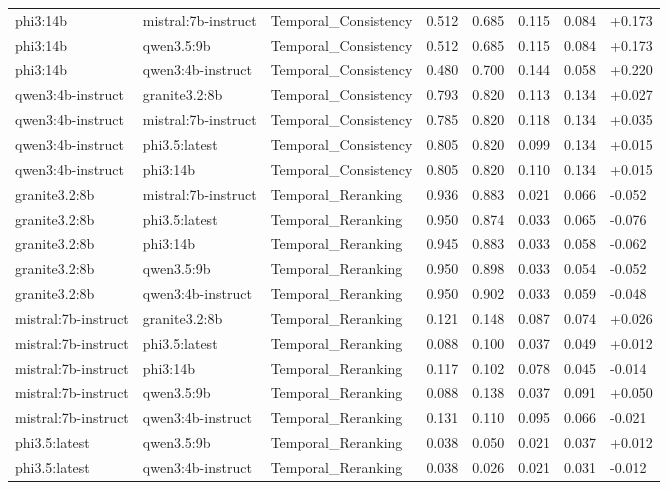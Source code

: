 \begin{table}
\begin{tabular}{llllllll}
phi3:14b & mistral:7b-instruct & Temporal_Consistency & 0.512 & 0.685 & 0.115 & 0.084 & +0.173 \\
phi3:14b & qwen3.5:9b & Temporal_Consistency & 0.512 & 0.685 & 0.115 & 0.084 & +0.173 \\
phi3:14b & qwen3:4b-instruct & Temporal_Consistency & 0.480 & 0.700 & 0.144 & 0.058 & +0.220 \\
qwen3:4b-instruct & granite3.2:8b & Temporal_Consistency & 0.793 & 0.820 & 0.113 & 0.134 & +0.027 \\
qwen3:4b-instruct & mistral:7b-instruct & Temporal_Consistency & 0.785 & 0.820 & 0.118 & 0.134 & +0.035 \\
qwen3:4b-instruct & phi3.5:latest & Temporal_Consistency & 0.805 & 0.820 & 0.099 & 0.134 & +0.015 \\
qwen3:4b-instruct & phi3:14b & Temporal_Consistency & 0.805 & 0.820 & 0.110 & 0.134 & +0.015 \\
granite3.2:8b & mistral:7b-instruct & Temporal_Reranking & 0.936 & 0.883 & 0.021 & 0.066 & -0.052 \\
granite3.2:8b & phi3.5:latest & Temporal_Reranking & 0.950 & 0.874 & 0.033 & 0.065 & -0.076 \\
granite3.2:8b & phi3:14b & Temporal_Reranking & 0.945 & 0.883 & 0.033 & 0.058 & -0.062 \\
granite3.2:8b & qwen3.5:9b & Temporal_Reranking & 0.950 & 0.898 & 0.033 & 0.054 & -0.052 \\
granite3.2:8b & qwen3:4b-instruct & Temporal_Reranking & 0.950 & 0.902 & 0.033 & 0.059 & -0.048 \\
mistral:7b-instruct & granite3.2:8b & Temporal_Reranking & 0.121 & 0.148 & 0.087 & 0.074 & +0.026 \\
mistral:7b-instruct & phi3.5:latest & Temporal_Reranking & 0.088 & 0.100 & 0.037 & 0.049 & +0.012 \\
mistral:7b-instruct & phi3:14b & Temporal_Reranking & 0.117 & 0.102 & 0.078 & 0.045 & -0.014 \\
mistral:7b-instruct & qwen3.5:9b & Temporal_Reranking & 0.088 & 0.138 & 0.037 & 0.091 & +0.050 \\
mistral:7b-instruct & qwen3:4b-instruct & Temporal_Reranking & 0.131 & 0.110 & 0.095 & 0.066 & -0.021 \\
phi3.5:latest & qwen3.5:9b & Temporal_Reranking & 0.038 & 0.050 & 0.021 & 0.037 & +0.012 \\
phi3.5:latest & qwen3:4b-instruct & Temporal_Reranking & 0.038 & 0.026 & 0.021 & 0.031 & -0.012 \\

\end{tabular}
\end{table}
